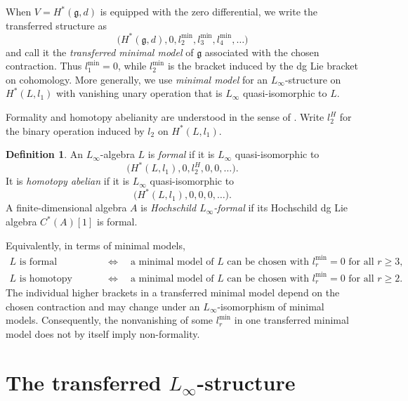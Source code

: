 \documentclass[11pt,a4paper,reqno]{amsart}
\theoremstyle{plain}
\theoremstyle{definition}
\newtheorem{definition}[definition]{Definition}
\numberwithin{equation}{section}
\begin{document}
	When $V=H^*(\mathfrak g,d)$ is equipped with the zero differential, we write
	the transferred structure as
	\[
	\bigl(
	H^*(\mathfrak g,d),
	0,
	l_2^{\min},
	l_3^{\min},
	l_4^{\min},
	\ldots
	\bigr)
	\]
	and call it the \emph{transferred minimal model} of $\mathfrak g$ associated
	with the chosen contraction. Thus $l_1^{\min}=0$, while
	$l_2^{\min}$ is the bracket induced by the dg Lie bracket on cohomology.
	More generally, we use \emph{minimal model} for an $L_\infty$-structure on
	$H^*(L,l_1)$ with vanishing unary operation that is $L_\infty$
	quasi-isomorphic to $L$.
	
	Formality and homotopy abelianity are understood in the sense of
	\cite[Definitions~6.2.1--6.2.2 and Section~12.7]{Man22}.
	Write $l_2^H$ for the binary operation induced by $l_2$ on $H^*(L,l_1)$.
	
	\begin{definition}\label{def:formality}
		An $L_\infty$-algebra $L$ is \emph{formal} if it is $L_\infty$
		quasi-isomorphic to
		\[
		\bigl(H^*(L,l_1),0,l_2^H,0,0,\ldots\bigr).
		\]
		It is \emph{homotopy abelian} if it is $L_\infty$ quasi-isomorphic to
		\[
		\bigl(H^*(L,l_1),0,0,0,\ldots\bigr).
		\]
		A finite-dimensional algebra $A$ is \emph{Hochschild $L_\infty$-formal} if
		its Hochschild dg Lie algebra $C^*(A)[1]$ is formal.
	\end{definition}
	
	Equivalently, in terms of minimal models,
	\[
	\begin{aligned}
		L\text{ is formal}
		&\quad\Longleftrightarrow\quad
		\text{a minimal model of }L\text{ can be chosen with }
		l_r^{\min}=0\text{ for all }r\geq3,
		\\
		L\text{ is homotopy abelian}
		&\quad\Longleftrightarrow\quad
		\text{a minimal model of }L\text{ can be chosen with }
		l_r^{\min}=0\text{ for all }r\geq2.
	\end{aligned}
	\]
	The individual higher brackets in a transferred minimal model depend on the
	chosen contraction and may change under an $L_\infty$-isomorphism of minimal
	models. Consequently, the nonvanishing of some $l_r^{\min}$ in one
	transferred minimal model does not by itself imply non-formality.
	
	
	\section{The transferred \texorpdfstring{$L_\infty$}{L-infinity}-structure}\label{sec:main-formulas}
	
\end{document}
